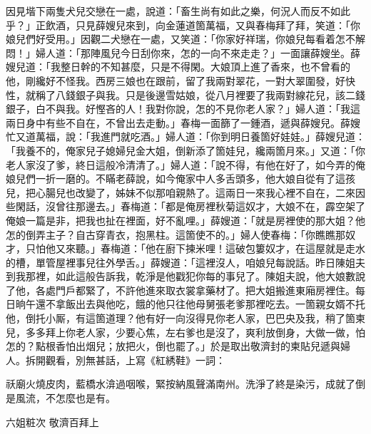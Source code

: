 因見堦下兩隻犬兒交戀在一處，說道：「畜生尚有如此之樂，何況人而反不如此乎？」正飲酒，只見薛嫂兒來到，向金蓮道箇萬福，又與春梅拜了拜，笑道：「你娘兒們好受用。」因觀二犬戀在一處，又笑道：「你家好祥瑞，你娘兒每看着怎不解悶！」婦人道：「那陣風兒今日刮你來，怎的一向不來走走？」一面讓薛嫂坐。薛嫂兒道：「我整日幹的不知甚麼，只是不得閑。大娘頂上進了香來，也不曾看的他，剛纔好不怪我。西房三娘也在跟前，留了我兩對翠花，一對大翠圍發，好快性，就稱了八錢銀子與我。只是後邊雪姑娘，從八月裡要了我兩對線花兒，該二錢銀子，白不與我。好慳吝的人！{}我對你說，怎的不見你老人家？」婦人道：「我這兩日身中有些不自在，不曾出去走動。」春梅一面篩了一鍾酒，遞與薛嫂兒。薛嫂忙又道萬福，說：「我進門就吃酒。」婦人道：「你到明日養箇好娃娃。」薛嫂兒道：「我養不的，俺家兒子媳婦兒金大姐，倒新添了箇娃兒，纔兩箇月來。」{}又道：「你老人家沒了爹，終日這般冷清清了。」婦人道：「說不得，有他在好了，如今弄的俺娘兒們一折一磨的。不瞞老薛說，如今俺家中人多舌頭多，他大娘自從有了這孩兒，把心腸兒也改變了，姊妹不似那咱親熱了。這兩日一來我心裡不自在，二來因些閑話，沒曾往那邊去。」春梅道：「都是俺房裡秋菊這奴才，大娘不在，霹空架了俺娘一篇是非，把我也扯在裡面，好不亂哩。」{}薛嫂道：「就是房裡使的那大姐？他怎的倒弄主子？自古穿青衣，抱黑柱。這箇使不的。」婦人使春梅：「你瞧瞧那奴才，只怕他又來聽。」{}春梅道：「他在廚下揀米哩！這破包簍奴才，在這屋就是走水的槽，單管屋裡事兒往外學舌。」薛嫂道：「這裡沒人，咱娘兒每說話。昨日陳姐夫到我那裡，如此這般告訴我，乾淨是他戳犯你每的事兒了。陳姐夫說，他大娘數說了他，各處門戶都緊了，不許他進來取衣裳拿藥材了。把大姐搬進東廂房裡住。每日晌午還不拿飯出去與他吃，餓的他只往他母舅張老爹那裡吃去。一箇親女婿不托他，倒托小厮，有這箇道理？他有好一向沒得見你老人家，巴巴央及我，稍了箇柬兒，多多拜上你老人家，少要心焦，左右爹也是沒了，爽利放倒身，大做一做，怕怎的？{}點根香怕出烟兒；放把火，倒也罷了。」於是取出敬濟封的柬貼兒遞與婦人。拆開觀看，別無甚話，上寫《紅綉鞋》一詞：

\begin{myquote}
祅廟火燒皮肉，藍橋水渰過咽喉，緊按納風聲滿南州。洗淨了終是染污，成就了倒是風流，不怎麼也是有。{}

六姐粧次 敬濟百拜上
\end{myquote}

